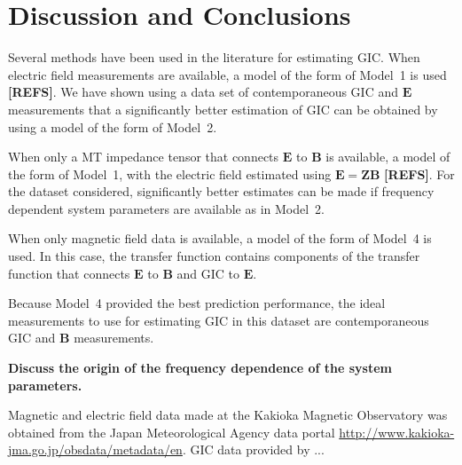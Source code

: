 \documentclass[draft,linenumbers]{agujournal2018}
\begin{document}
\section{Discussion and Conclusions}

Several methods have been used in the literature for estimating GIC. When electric field measurements are available, a model of the form of Model~1 is used  {\color{red} \textbf{[REFS]}}. We have shown using a data set of contemporaneous GIC and $\mathbf{E}$ measurements that a significantly better estimation of GIC can be obtained by using a model of the form of Model~2.

When only a MT impedance tensor that connects $\mathbf{E}$ to $\mathbf{B}$ is available, a model of the form of Model~1, with the electric field estimated using $\mathbf{E}=\mathbf{Z}\mathbf{B}$  {\color{red} \textbf{[REFS]}}. For the dataset considered, significantly better estimates can be made if frequency dependent system parameters are available as in Model~2.

When only magnetic field data is available, a model of the form of Model~4 is used. In this case, the transfer function contains components of the transfer function that connects $\mathbf{E}$ to $\mathbf{B}$ and GIC to $\mathbf{E}$. 

Because Model~4 provided the best prediction performance, the ideal measurements to use for estimating GIC in this dataset are contemporaneous GIC and $\mathbf{B}$ measurements.

 {\color{red}\textbf{Discuss the origin of the frequency dependence of the system parameters.}}

\acknowledgments
Magnetic and electric field data made at the Kakioka Magnetic Observatory was obtained from the Japan Meteorological Agency data portal \url{http://www.kakioka-jma.go.jp/obsdata/metadata/en}. GIC data provided by ... 

\clearpage
\end{document}
